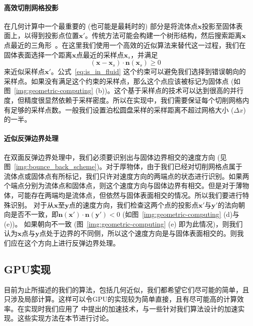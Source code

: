 \paragraph{高效切削网格投影}
在几何计算中一个最重要的 (也可能是最耗时的) 部分是将流体点$\bm{x}$投影至固体表面上，以得到投影点位置$\bm{x}'$。传统方法可能会构建一个树形结构，然后搜索距离$\bm{x}$点最近的三角形~\citep{wang-2012}。在这里我们使用一个高效的近似算法来替代这一过程，我们在固体表面选择一个距离$\bm{x}$点最近的采样点$\bm{x}_s$，并满足
\begin{equation}\label{eq:is_in_fluid}
(\bm{x}-\bm{x}_s)\cdot \bm{n}(\bm{x}_s) \geq 0\;
\end{equation}
来近似采样点$\bm{x}'$。公式~\ref{eq:is_in_fluid} 这个约束可以避免我们选择到错误朝向的采样点。如果没有满足这个约束的采样点，那么这个点应该被标记为固体点 (如图~\ref{img:geometric-computing} (b))。这个基于采样点的技术可以达到很高的并行度，但精度很显然依赖于采样密度。所以在实现中，我们需要保证每个切削网格内有足够的采样点数。一般我们设置泊松圆盘采样的采样距离不超过网格大小 ($\Delta x$) 的一半。

\paragraph{近似反弹边界处理}
在双面反弹边界处理中，我们必须要识别出与固体边界相交的速度方向 (见图~\ref{img:bounce_back_scheme})。对于厚物体，由于我们已经对切削网格点属于流体点或固体点有所标记，我们只许对速度方向的两端点的状态进行识别。如果两个端点分别为流体点和固体点，则这个速度方向与固体边界有相交。但是对于薄物体，可能存在两端均是流体点，但依然与固体表面相交的情况。所以我们要进行特殊识别。
对于从$\bm{x}$至$\bm{y}$点的速度方向，我们检查这两个点的投影点$\bm{x}'$与$\bm{y}'$的法向朝向是否不一致，即$\bm{n}(\bm{x}')\!\cdot\!\bm{n}(\bm{y'})\!<\!0$ (如图~\ref{img:geometric-computing} (d)与(e))。
如果朝向不一致 (图~\ref{img:geometric-computing} (e) 即为此情况)，则我们认为$\bm{x}$点与$\bm{y}$点处于边界的不同侧，所以这个速度方向是与固体表面相交的。则我们应在这个方向上进行反弹边界处理。

\subsection{GPU实现}
目前为止所描述的我们的算法，包括几何近似，我们都希望它们尽可能的简单，且只涉及局部计算。这样可以令GPU的实现较为简单直接，且有尽可能高的计算效率。在实现时我们应用了 \citet{Chen-2021} 中提出的加速技术，与一些针对我们算法设计的加速实现。这些实现方法在本节进行讨论。

